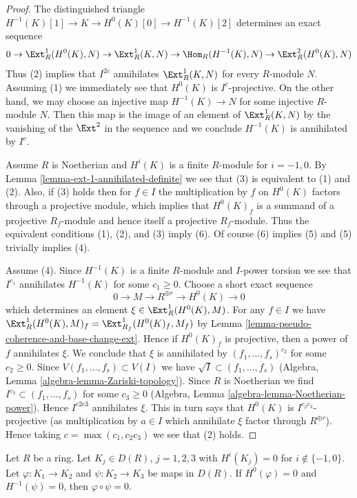 \begin{proof}
The distinguished triangle $H^{-1}(K)[1] \to K \to H^0(K)[0] \to H^{-1}(K)[2]$
determines an exact sequence
$$
0 \to \Ext^1_R(H^0(K), N) \to \Ext^1_R(K, N) \to \Hom_R(H^{-1}(K), N) \to
\Ext^2_R(H^0(K), N)
$$
Thus (2) implies that $I^{2c}$ annihilates $\Ext^1_R(K, N)$ for every
$R$-module $N$. Assuming (1) we immediately see that $H^0(K)$ is
$I^c$-projective. On the other hand, we may choose an injective map
$H^{-1}(K) \to N$ for some injective $R$-module $N$. Then this map
is the image of an element of $\Ext^1_R(K, N)$ by the vanishing
of the $\Ext^2$ in the sequence and we conclude $H^{-1}(K)$
is annihilated by $I^c$.

\medskip\noindent
Assume $R$ is Noetherian and $H^i(K)$ is a finite $R$-module
for $i = -1, 0$. By Lemma \ref{lemma-ext-1-annihilated-definite}
we see that (3) is equivalent to (1) and (2). Also, if (3)
holds then for $f \in I$ the multiplication by $f$ on
$H^0(K)$ factors through a projective module, which implies
that $H^0(K)_f$ is a summand of a projective $R_f$-module and hence
itself a projective $R_f$-module. Thus the equivalent conditions
(1), (2), and (3) imply (6).
Of course (6) implies (5) and (5) trivially implies (4).

\medskip\noindent
Assume (4). Since $H^{-1}(K)$ is a finite $R$-module and $I$-power torsion
we see that $I^{c_1}$ annihilates $H^{-1}(K)$ for some $c_1 \geq 0$.
Choose a short exact sequence
$$
0 \to M \to R^{\oplus r} \to H^0(K) \to 0
$$
which determines an element $\xi \in \Ext^1_R(H^0(K), M)$.
For any $f \in I$ we have $\Ext^1_R(H^0(K), M)_f = \Ext^1_{R_f}(H^0(K)_f, M_f)$
by Lemma \ref{lemma-pseudo-coherence-and-base-change-ext}.
Hence if $H^0(K)_f$ is projective, then a power of $f$ annihilates $\xi$.
We conclude that $\xi$ is annihilated by $(f_1, \ldots, f_s)^{c_2}$
for some $c_2 \geq 0$. Since $V(f_1, \ldots, f_s) \subset V(I)$ we have
$\sqrt{I} \subset (f_1, \ldots, f_s)$
(Algebra, Lemma \ref{algebra-lemma-Zariski-topology}).
Since $R$ is Noetherian we find $I^{c_3} \subset (f_1, \ldots, f_s)$
for some $c_3 \geq 0$ (Algebra, Lemma \ref{algebra-lemma-Noetherian-power}).
Hence $I^{c2c3}$ annihilates $\xi$.
This in turn says that $H^0(K)$ is $I^{c_2c_3}$-projective (as multiplication
by $a \in I$ which annihilate $\xi$ factor through $R^{\oplus r}$).
Hence taking $c = \max(c_1, c_2c_3)$ we see that (2) holds.
\end{proof}

\begin{lemma}
\label{lemma-zero-in-derived}
Let $R$ be a ring. Let $K_j \in D(R)$, $j = 1, 2, 3$ with $H^i(K_j) = 0$
for $i \not \in \{-1, 0\}$. Let $\varphi : K_1 \to K_2$ and
$\psi : K_2 \to K_3$ be maps in $D(R)$.
If $H^0(\varphi) = 0$ and $H^{-1}(\psi) = 0$, then
$\varphi \circ \psi = 0$.
\end{lemma}

